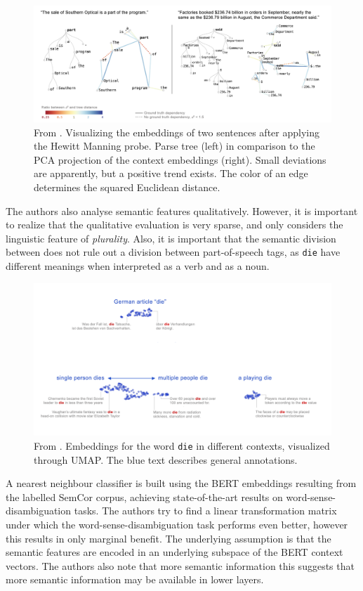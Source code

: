 \documentclass[a4paper,12pt,twoside,openright]{report}
\begin{document}
\begin{figure}[H]
	\center
  \includegraphics[width=\linewidth]{./assets/relatedwork/BERT_tree.png}
  \caption{From \cite{coenen19}. Visualizing the embeddings of two sentences after applying the Hewitt Manning probe. Parse tree (left) in comparison to the PCA projection of the context embeddings (right). Small deviations are apparently, but a positive trend exists. The color of an edge determines the squared Euclidean distance.}
  \label{fig:BERT_tree}
\end{figure}

The authors also analyse semantic features qualitatively.
However, it is important to realize that the qualitative evaluation is very sparse, and only considers the linguistic feature of \textit{plurality}.
Also, it is important that the semantic division between does not rule out a division between part-of-speech tags, as \texttt{die} have different meanings when interpreted as a verb and as a noun.

\begin{figure}[H]
	\center
  \includegraphics[width=0.7\linewidth]{./assets/relatedwork/BERT_plurality.png}
  \caption{From \cite{coenen19}. Embeddings for the word \texttt{die} in different contexts, visualized through UMAP. The blue text describes general annotations.}
  \label{fig:BERT_plurality}
\end{figure}

A nearest neighbour classifier is built using the BERT embeddings resulting from the labelled SemCor corpus, achieving state-of-the-art results on word-sense-disambiguation tasks.
The authors try to find a linear transformation matrix under which the word-sense-disambiguation task performs even better, however this results in only marginal benefit.
The underlying assumption is that the semantic features are encoded in an underlying subspace of the BERT context vectors.
The authors also note that more semantic information this suggests that more semantic information may be available in lower layers.
\end{document}

